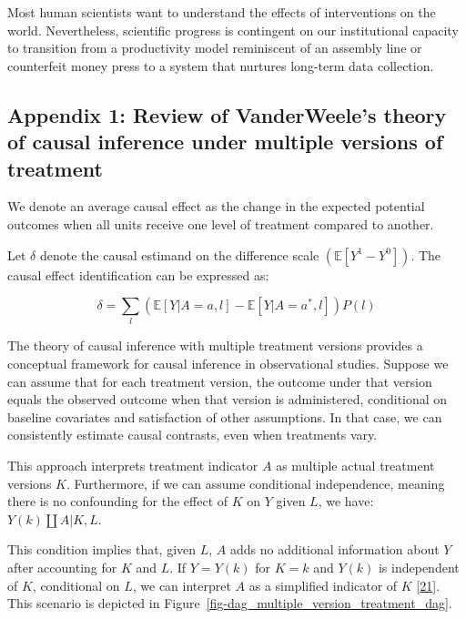 \documentclass[
  singlecolumn]{article}
\begin{document}
Most human scientists want to understand the effects of interventions on
the world. Nevertheless, scientific progress is contingent on our
institutional capacity to transition from a productivity model
reminiscent of an assembly line or counterfeit money press to a system
that nurtures long-term data collection.

\newpage{}

\hypertarget{appendix-1-review-of-vanderweeles-theory-of-causal-inference-under-multiple-versions-of-treatment}{%
\subsection{Appendix 1: Review of VanderWeele's theory of causal
inference under multiple versions of
treatment}\label{appendix-1-review-of-vanderweeles-theory-of-causal-inference-under-multiple-versions-of-treatment}}

We denote an average causal effect as the change in the expected
potential outcomes when all units receive one level of treatment
compared to another.

Let \(\delta\) denote the causal estimand on the difference scale
\((\mathbb{E}[Y^1 - Y^0])\). The causal effect identification can be
expressed as:

\[ \delta = \sum_l \left( \mathbb{E}[Y|A=a,l] - \mathbb{E}[Y|A=a^*,l] \right) P(l)\]

The theory of causal inference with multiple treatment versions provides
a conceptual framework for causal inference in observational studies.
Suppose we can assume that for each treatment version, the outcome under
that version equals the observed outcome when that version is
administered, conditional on baseline covariates and satisfaction of
other assumptions. In that case, we can consistently estimate causal
contrasts, even when treatments vary.

This approach interprets treatment indicator \(A\) as multiple actual
treatment versions \(K\). Furthermore, if we can assume conditional
independence, meaning there is no confounding for the effect of \(K\) on
\(Y\) given \(L\), we have: \(Y(k)\coprod A|K,L\).

This condition implies that, given \(L\), \(A\) adds no additional
information about \(Y\) after accounting for \(K\) and \(L\). If
\(Y = Y(k)\) for \(K = k\) and \(Y(k)\) is independent of \(K\),
conditional on \(L\), we can interpret \(A\) as a simplified indicator
of \(K\) {[}\protect\hyperlink{ref-vanderweele2013}{21}{]}. This
scenario is depicted in
Figure~\ref{fig-dag_multiple_version_treatment_dag}.
\end{document}
